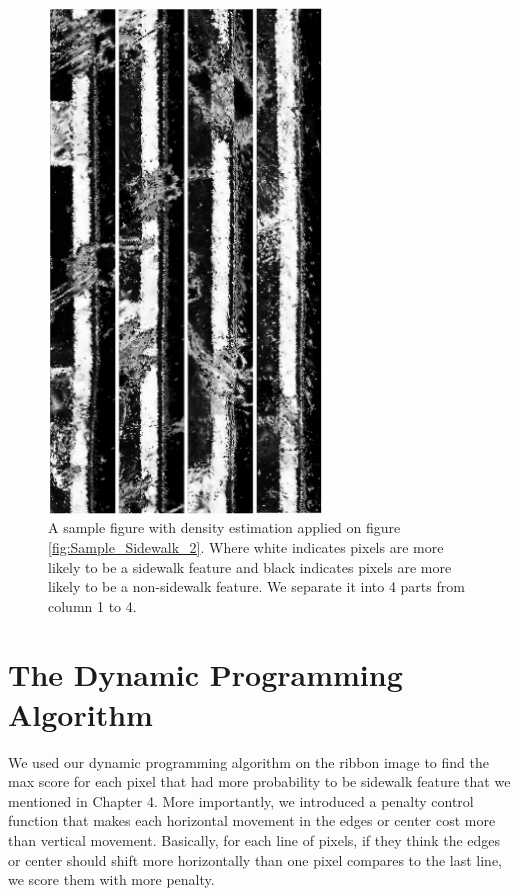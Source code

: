 \begin{figure}[H]
    \centering
    \includegraphics[width=0.65\textwidth]{Figures/GMM_SAMPLE2.png}
    \caption[Density Estimation on Sample Sidewalk]{A sample figure with density estimation applied on figure \ref{fig:Sample_Sidewalk_2}. Where white indicates pixels are more likely to be a sidewalk feature and black indicates pixels are more likely to be a non-sidewalk feature. We separate it into 4 parts from column 1 to 4.}
    \label{fig:GMM_Sample_2}
\end{figure}

\section{The Dynamic Programming Algorithm}

We used our dynamic programming algorithm on the ribbon image to find the max score for each pixel that had more probability to be sidewalk feature that we mentioned in Chapter 4. More importantly, we introduced a penalty control function that makes each horizontal movement in the edges or center cost more than vertical movement. Basically, for each line of pixels, if they think the edges or center should shift more horizontally than one pixel compares to the last line, we score them with more penalty. 

